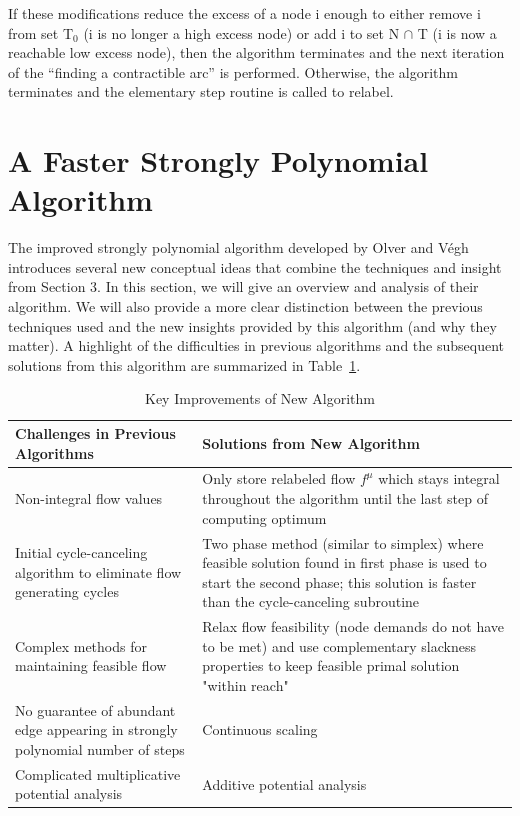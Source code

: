 \documentclass[11pt]{article}
\theoremstyle{definition}
\theoremstyle{definition}
\begin{document}
If these modifications reduce the excess of a node i enough to either remove i from set T$_0$ (i is no longer a high excess node) or add i to set N $\cap$ T (i is now a reachable low excess node), then the algorithm terminates and the next iteration of the ``finding a contractible arc'' is performed. Otherwise, the algorithm terminates and the elementary step routine is called to relabel.

\section{A Faster Strongly Polynomial Algorithm} The improved strongly polynomial algorithm developed by Olver and Végh \cite{Olver2017} introduces several new conceptual ideas that combine the techniques and insight from Section 3. In this section, we will give an overview and analysis of their algorithm. We will also provide a more clear distinction between the previous techniques used and the new insights provided by this algorithm (and why they matter). A highlight of the difficulties in previous algorithms and the subsequent solutions from this algorithm are summarized in Table~\ref{tab:improvements}.

\begin{table}[H]
\begin{center}
    \begin{tabular}{ | p{7cm} | p{7cm} |}
    \hline
    Challenges in Previous Algorithms  & Solutions from New Algorithm \\ \hline
    Non-integral flow values & Only store relabeled flow $f^{\mu}$ which stays integral throughout the algorithm until the last step of computing optimum \\ \hline
    Initial cycle-canceling algorithm to eliminate flow generating cycles & Two phase method (similar to simplex) where feasible solution found in first phase is used to start the second phase; this solution is faster than the cycle-canceling subroutine \\ \hline
    Complex methods for maintaining feasible flow & Relax flow feasibility (node demands do not have to be met) and use complementary slackness properties to keep feasible primal solution "within reach" \\ \hline
    No guarantee of abundant edge appearing in strongly polynomial number of steps \cite{Radzik2004} &  Continuous scaling\\ \hline
    Complicated multiplicative potential analysis \cite{Vegh2013} & Additive potential analysis \\
    \hline
    \end{tabular}
\end{center}
\caption{Key Improvements of New Algorithm}
\label{tab:improvements}
\end{table}
\end{document}
